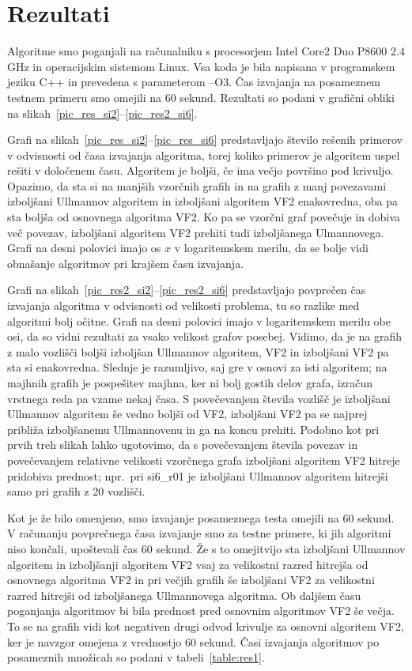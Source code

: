 \documentclass[a4paper, 12pt, ]{book}
\begin{document}
		
	\section{Rezultati}
	Algoritme smo poganjali na računalniku s procesorjem Intel Core2 Duo P8600 2.4 GHz in operacijskim sistemom Linux. Vsa koda je bila napisana v
	programskem jeziku C++ in prevedena s parameterom --O3. Čas izvajanja na posameznem testnem primeru smo omejili na 60 sekund. Rezultati so
	podani v grafični obliki na slikah~\ref{pic_res_si2}--\ref{pic_res2_si6}.
	
	Grafi na slikah~\ref{pic_res_si2}--\ref{pic_res_si6} predstavljajo število rešenih
	primerov v odvisnosti od časa izvajanja algoritma, torej koliko primerov je algoritem uspel rešiti v določenem času. Algoritem je boljši, če ima večjo
	površino pod krivuljo. Opazimo, da sta si na manjših vzorčnih grafih in na grafih z manj povezavami izboljšani Ullmannov algoritem in izboljšani algoritem
	VF2 enakovredna, oba pa sta boljša od osnovnega algoritma VF2. Ko pa se vzorčni graf povečuje in dobiva več povezav, izboljšani algoritem VF2 prehiti
	tudi izboljšanega Ulmannovega. Grafi na desni polovici imajo os $x$ v logaritemskem merilu, da se bolje vidi obnašanje algoritmov pri krajšem času
	izvajanja.
	
	Grafi na slikah~\ref{pic_res2_si2}--\ref{pic_res2_si6} predstavljajo povprečen čas izvajanja algoritma v odvisnosti od velikosti problema, tu so
	razlike med algoritmi bolj očitne. Grafi na desni polovici imajo v logaritemskem merilu obe osi, da so vidni rezultati za vsako velikost grafov posebej.
	Vidimo, da je na grafih z malo vozlišči boljši izboljšan Ullmannov algoritem, VF2 in izboljšani VF2 pa sta si enakovredna. Slednje je razumljivo, saj 
	gre v osnovi za isti algoritem; na majhnih grafih je pospešitev majhna, ker ni bolj gostih delov grafa, izračun vrstnega reda pa vzame nekaj časa.	
	S povečevanjem števila vozlišč je izboljšani Ullmannov algoritem še vedno boljši od VF2, izboljšani VF2 pa se najprej
	približa izboljšanemu Ullmannovenu in ga na koncu prehiti. Podobno kot pri prvih treh slikah lahko ugotovimo, da s povečevanjem števila povezav
	in povečevanjem relativne velikosti vzorčnega grafa izboljšani algoritem VF2 hitreje pridobiva prednost; npr.~pri si6\_r01 je izboljšani Ullmannov
	algoritem hitrejši samo pri grafih z 20 vozlišči. 
	
	Kot je že bilo omenjeno, smo izvajanje posameznega testa omejili na 60 sekund. V računanju 
	povprečnega časa izvajanje smo za testne primere, ki jih algoritmi niso končali, upoštevali čas 60 sekund. Že s to omejitvijo sta izboljšani Ullmannov
	algoritem in izboljšanji algoritem VF2 vsaj za velikostni razred hitrejša od osnovnega algoritma VF2 in pri večjih grafih še izboljšani VF2 za velikostni
	razred hitrejši od izboljšanega Ullmannovega algoritma. Ob daljšem času poganjanja algoritmov bi bila prednost pred osnovnim algoritmov VF2 še večja.
	To se na grafih vidi kot negativen drugi odvod krivulje za osnovni algoritem VF2, ker je navzgor omejena z vrednostjo 60 sekund. Časi izvajanja 
	algoritmov po posameznih množicah so podani v tabeli~\ref{table:res1}.
	
\end{document}
